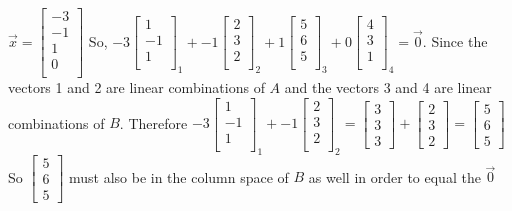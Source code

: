 				$\vec{x}=\begin{bmatrix}
				    -3 \\ -1 \\ 1 \\ 0 \\
				\end{bmatrix}$ So,
				\newline
				$-3\begin{bmatrix}
				    1 \\ -1 \\ 1 \\ 
				\end{bmatrix}_1+ -1\begin{bmatrix}
				    2 \\ 3 \\ 2 \\ 
				\end{bmatrix}_2+1\begin{bmatrix}
				    5 \\ 6 \\ 5 \\ 
				\end{bmatrix}_3+0\begin{bmatrix}
				    4 \\ 3 \\ 1 \\ 
				\end{bmatrix}_4=\vec{0}$. Since the vectors 1 and 2 are linear combinations of $A$ and the vectors 3 and 4 are linear combinations of $B$.  Therefore 
				\newline
				$-3\begin{bmatrix}
				    1 \\ -1 \\ 1 \\ 
				\end{bmatrix}_1+ -1\begin{bmatrix}
				    2 \\ 3 \\ 2 \\ 
				\end{bmatrix}_2=\begin{bmatrix}
				    3 \\ 3 \\ 3
				\end{bmatrix}+\begin{bmatrix}
				    2 \\ 3 \\ 2
				\end{bmatrix}=\begin{bmatrix}
				    5 \\ 6 \\ 5
				\end{bmatrix}$
				\newline
				So $\begin{bmatrix}
				    5 \\ 6 \\ 5
				\end{bmatrix}$ must also be in the column space of $B$ as well in order to equal the $\vec{0}$
			